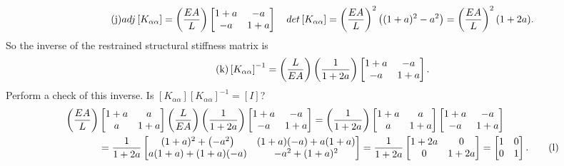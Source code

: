 \documentclass{AeroStructure-ERJohnson}
\begin{document}
\begin{example}
\begin{align}\label{eq16.2j}\tag{j}
a d j\left[K_{\alpha \alpha}\right]=\left(\frac{E A}{L}\right)\left[\begin{array}{@{}cc@{}}1+a & -a \\-a & 1+a\end{array}\right] \quad {det}\left[K_{\alpha \alpha}\right]=\left(\frac{E A}{L}\right)^{2}\left((1+a)^{2}-a^{2}\right)=\left(\frac{E A}{L}\right)^{2}(1+2 a).
\end{align}
So the inverse of the restrained structural stiffness matrix is
\begin{align}\label{eq16.2k}\tag{k}
\left[K_{\alpha \alpha}\right]^{-1}=\left(\frac{L}{E A}\right)\left(\frac{1}{1+2 a}\right)\left[\begin{array}{@{}cc@{}}1+a & -a \\-a & 1+a\end{array}\right].
\end{align}
Perform a check of this inverse. Is $\left[K_{\alpha \alpha}\right]\left[K_{\alpha \alpha}\right]^{-1}=[I]$?
\begin{align}
\left(\frac{E A}{L}\right)&\left[\begin{array}{@{}cc@{}}1+a & a \\a & 1+a\end{array}\right]\left(\frac{L}{E A}\right)\left(\frac{1}{1+2 a}\right)\left[\begin{array}{@{}cc@{}}1+a & -a \\-a & 1+a\end{array}\right]=\left(\frac{1}{1+2 a}\right)\left[\begin{array}{@{}cc@{}}1+a & a \\a & 1+a\end{array}\right]\left[\begin{array}{@{}cc@{}}1+a & -a \\-a & 1+a\end{array}\right] \nonumber\\
&=\frac{1}{1+2 a}\left[\begin{array}{@{}cc@{}}(1+a)^{2}+\left(-a^{2}\right) &(1+a)(-a)+a(1+a) \\ a(1+a)+(1+a)(-a)&-a^{2}+(1+a)^2\end{array}\right]=\frac{1}{1+2 a}\left[\begin{array}{@{}cc@{}}1+2 a & 0 \\0 & 1+2 a\end{array}\right]=\left[\begin{array}{@{}cc@{}}1 & 0 \\0 & 1\end{array}\right].\label{eq16.2l}\tag{l}

\end{align}
\end{example}
\end{document}
